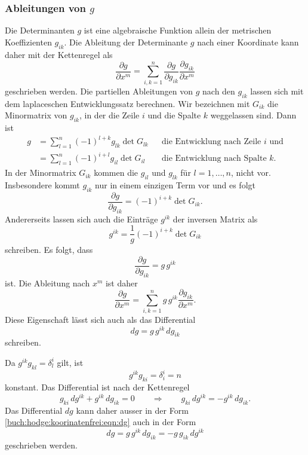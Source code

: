 %
%
\subsubsection{Ableitungen von $g$}
Die Determinanten $g$ ist eine algebraische Funktion allein der 
metrischen Koeffizienten $g_{ik}$.
Die Ableitung der Determinante $g$ nach einer Koordinate kann daher
mit der Kettenregel als
\begin{equation*}
\frac{\partial g}{\partial x^m}
=
\sum_{i,k=1}^n
\frac{\partial g}{\partial g_{ik}}
\frac{\partial g_{ik}}{\partial x^m}
\end{equation*}
geschrieben werden.
Die partiellen Ableitungen von $g$ nach den $g_{ik}$ lassen sich
mit dem laplaceschen Entwicklungssatz berechnen.
Wir bezeichnen mit $G_{ik}$ die Minormatrix von $g_{ik}$, in der
die Zeile $i$ und die Spalte $k$ weggelassen sind.
Dann ist 
\begin{align*}
g
&=
\sum_{l=1}^n (-1)^{l+k} g_{lk} \det G_{lk}
&&\text{die Entwicklung nach Zeile $i$ und}
\\
&=
\sum_{l=1}^n (-1)^{i+l} g_{il} \det G_{il}
&&\text{die Entwicklung nach Spalte $k$.}
\end{align*}
In der Minormatrix $G_{ik}$ kommen die $g_{il}$ und $g_{lk}$ für
$l=1,\dots,n$, nicht vor.
Insbesondere kommt $g_{ik}$ nur in einem einzigen Term vor und es
folgt
\[
\frac{\partial g}{\partial g_{ik}}
=
(-1)^{i+k}
\det G_{ik}.
\]
Andererseits lassen sich auch die Einträge $g^{ik}$ der inversen
Matrix als
\[
g^{ik} = \frac{1}{g} (-1)^{i+k} \det G_{ik}
\]
schreiben.
Es folgt, dass
\[
\frac{\partial g}{\partial g_{ik}}
=
g\, g^{ik}
\]
ist.
Die Ableitung nach $x^m$ ist daher
\[
\frac{\partial g}{\partial x^m}
=
\sum_{i,k=1}^n g\,g^{ik} \frac{\partial g_{ik}}{\partial x^m}.
\]
Diese Eigenschaft lässt sich auch als das Differential
\begin{equation}
dg
=
g\,g^{ik}\,dg_{ik}
\label{buch:hodge:koorinatenfrei:eqn:dg}
\end{equation}
schreiben.

Da $g^{ik}g_{kl}=\delta^i_l$ gilt, ist
\[
g^{ik}g_{ki} = \delta^i_i = n
\]
konstant.
Das Differential ist nach der Kettenregel
\[
g_{ki}\,dg^{ik}
+
g^{ik}\,dg_{ik}
=
0
\qquad\Rightarrow\qquad
g_{ki}\,dg^{ik}
=
-
g^{ik}\,dg_{ik}.
\]
Das Differential $dg$ kann daher ausser in der Form
\eqref{buch:hodge:koorinatenfrei:eqn:dg}
auch in der Form
\begin{equation}
dg
=
g\,g^{ik}\,dg_{ik}
=
-
g\,g_{ik}\,dg^{ik}
\label{buch:hodge:koorinatenfrei:eqn:dg2}
\end{equation}
geschrieben werden.

